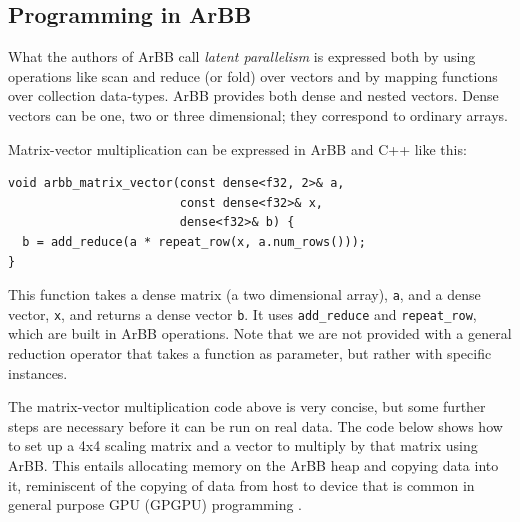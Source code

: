 \subsection{Programming in ArBB}
\label{sec:ProgrammingArBB}

What the authors of ArBB call {\em latent parallelism} is expressed both
by using operations like scan and reduce (or fold) over vectors and by
mapping functions over collection data-types.
ArBB provides both dense and nested vectors. 
Dense vectors can be one, two or three dimensional; they correspond
to ordinary arrays.


Matrix-vector multiplication can be expressed in ArBB and C++ like this: 
\begin{Verbatim}[samepage=true] 
void arbb_matrix_vector(const dense<f32, 2>& a, 
                        const dense<f32>& x,
                        dense<f32>& b) {
  b = add_reduce(a * repeat_row(x, a.num_rows()));
}
\end{Verbatim} 
\noindent
This function takes a dense matrix (a two dimensional array), {\tt a}, and a dense vector, {\tt x},
and returns a dense vector {\tt b}.
It
uses {\tt add\_reduce} and {\tt repeat\_row}, which are built in ArBB 
operations. Note that we are not provided with a general reduction operator
that takes a function as parameter,
but rather with specific instances.


The matrix-vector multiplication code above is very concise, but some further
steps are necessary before it can be run on real data. The code 
below shows how to set up a 4x4 scaling matrix and a vector to 
multiply by that matrix using ArBB. This entails allocating 
memory on the ArBB heap and copying data into it, reminiscent of the copying of
data from
host to 
device that is common in general purpose GPU (GPGPU) programming . 

